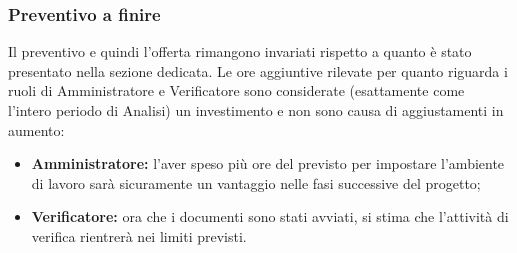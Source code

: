 \subsubsection{Preventivo a finire}
Il preventivo e quindi l'offerta rimangono invariati rispetto a quanto è stato presentato nella sezione dedicata. Le ore aggiuntive rilevate per quanto riguarda i ruoli di Amministratore e Verificatore sono considerate (esattamente come l'intero periodo di Analisi) un investimento e non sono causa di aggiustamenti in aumento: 
\begin{itemize}
    \item \textbf{Amministratore:} l'aver speso più ore del previsto per impostare l'ambiente di lavoro sarà sicuramente un vantaggio nelle fasi successive del progetto;
    \item \textbf{Verificatore:} ora che i documenti sono stati avviati, si stima che l'attività di verifica rientrerà nei limiti previsti.
\end{itemize}